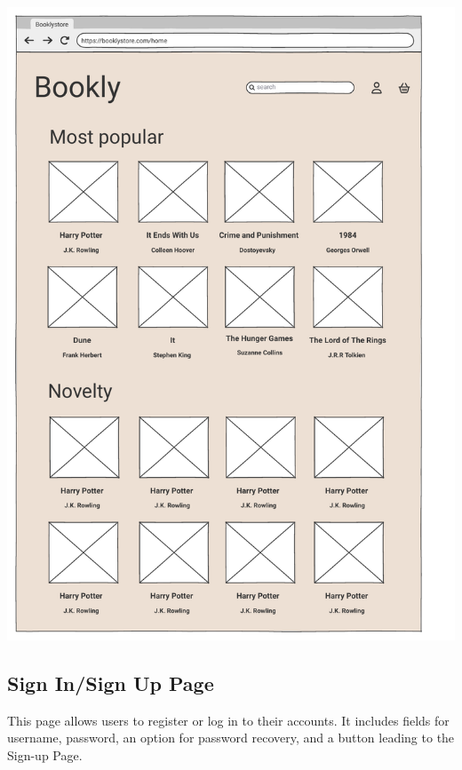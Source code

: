 \includegraphics[width=\textwidth]{homepage.png}


\subsection{Sign In/Sign Up Page} \label{sec:signin}
This page allows users to register or log in to their accounts. It includes fields for username, password, an option for password recovery, and a button leading to the Sign-up Page.

